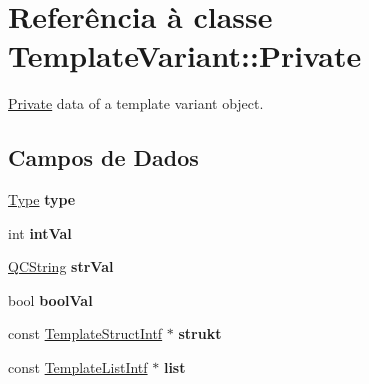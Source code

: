 \hypertarget{class_template_variant_1_1_private}{\section{Referência à classe Template\-Variant\-:\-:Private}
\label{class_template_variant_1_1_private}
}


\hyperlink{class_template_variant_1_1_private}{Private} data of a template variant object.  


\subsection*{Campos de Dados}
\begin{DoxyCompactItemize}
\item 
\hypertarget{class_template_variant_1_1_private_ab6f4e6d3fde00ce906e46494f60dfe7a}{\hyperlink{class_template_variant_a1d1cfd8ffb84e947f82999c682b666a7}{Type} {\bfseries type}}\label{class_template_variant_1_1_private_ab6f4e6d3fde00ce906e46494f60dfe7a}

\item 
\hypertarget{class_template_variant_1_1_private_aa1aa81212930ab4eddc11152877e9fdd}{int {\bfseries int\-Val}}\label{class_template_variant_1_1_private_aa1aa81212930ab4eddc11152877e9fdd}

\item 
\hypertarget{class_template_variant_1_1_private_af8f1c3b9aa1ca0811942f680f0ac2cec}{\hyperlink{class_q_c_string}{Q\-C\-String} {\bfseries str\-Val}}\label{class_template_variant_1_1_private_af8f1c3b9aa1ca0811942f680f0ac2cec}

\item 
\hypertarget{class_template_variant_1_1_private_aefac0b61b024ff36011be64f55a4c547}{bool {\bfseries bool\-Val}}\label{class_template_variant_1_1_private_aefac0b61b024ff36011be64f55a4c547}

\item 
\hypertarget{class_template_variant_1_1_private_a5a7c8f8a883e64a9e074e77590b61548}{const \hyperlink{class_template_struct_intf}{Template\-Struct\-Intf} $\ast$ {\bfseries strukt}}\label{class_template_variant_1_1_private_a5a7c8f8a883e64a9e074e77590b61548}

\item 
\hypertarget{class_template_variant_1_1_private_abb72400859d2f3fd9d7e7b95e006dba4}{const \hyperlink{class_template_list_intf}{Template\-List\-Intf} $\ast$ {\bfseries list}}\label{class_template_variant_1_1_private_abb72400859d2f3fd9d7e7b95e006dba4}


\end{DoxyCompactItemize}
